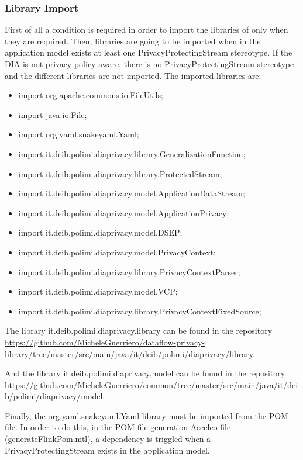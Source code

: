 \subsubsection{Library Import}

First of all  a condition is required in order to import the libraries of \cite{privacypoliciesarticle} only when they are required. Then, libraries are going to be imported when in the application model exists at least one PrivacyProtectingStream stereotype. If the DIA is not privacy policy aware, there is no PrivacyProtectingStream stereotype and the different libraries are not imported. The imported libraries are:

\begin{itemize}
\item import org.apache.commons.io.FileUtils;
\item import java.io.File;
\item import org.yaml.snakeyaml.Yaml;
\item import it.deib.polimi.diaprivacy.library.GeneralizationFunction;
\item import it.deib.polimi.diaprivacy.library.ProtectedStream;
\item import it.deib.polimi.diaprivacy.model.ApplicationDataStream;
\item import it.deib.polimi.diaprivacy.model.ApplicationPrivacy;
\item import it.deib.polimi.diaprivacy.model.DSEP;
\item import it.deib.polimi.diaprivacy.model.PrivacyContext;
\item import it.deib.polimi.diaprivacy.library.PrivacyContextParser;
\item import it.deib.polimi.diaprivacy.model.VCP;
\item import it.deib.polimi.diaprivacy.library.PrivacyContextFixedSource;
\end{itemize}

The library it.deib.polimi.diaprivacy.library can be found in the repository \url{https://github.com/MicheleGuerriero/dataflow-privacy-library/tree/master/src/main/java/it/deib/polimi/diaprivacy/library}.

And the library it.deib.polimi.diaprivacy.model can be found in the repository \url{https://github.com/MicheleGuerriero/common/tree/master/src/main/java/it/deib/polimi/diaprivacy/model}.

Finally, the org.yaml.snakeyaml.Yaml library must be imported from the POM file. In order to do this, in the POM file generation Acceleo file (generateFlinkPom.mtl), a dependency is triggled when a PrivacyProtectingStream exists in the application model.

